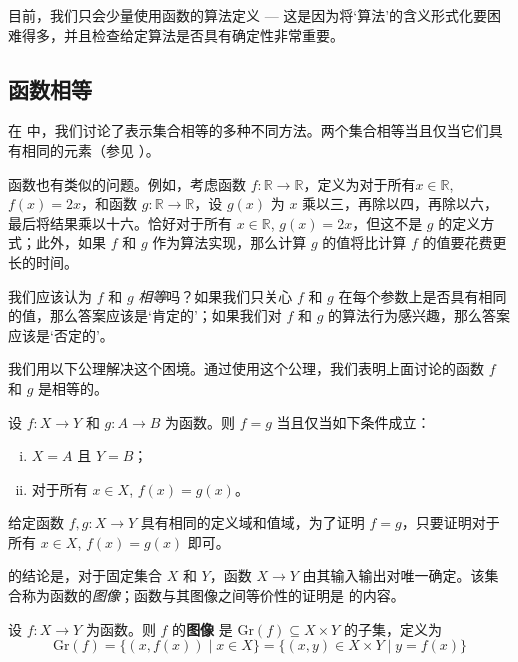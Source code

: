 目前，我们只会少量使用函数的算法定义 --- 这是因为将`算法'的含义形式化要困难得多，并且检查给定算法是否具有确定性非常重要。

\subsection*{函数相等}

在  中，我们讨论了表示集合相等的多种不同方法。两个集合相等当且仅当它们具有相同的元素（参见 ）。

函数也有类似的问题。例如，考虑函数 $f : \mathbb{R} \to \mathbb{R}$，定义为对于所有$x \in \mathbb{R}$, $f(x) = 2x$，和函数 $g : \mathbb{R} \to \mathbb{R}$，设 $g(x)$ 为 $x$ 乘以三，再除以四，再除以六，最后将结果乘以十六。恰好对于所有 $x \in \mathbb{R}$, $g(x) = 2x$，但这不是 $g$ 的定义方式；此外，如果 $f$ 和 $g$ 作为算法实现，那么计算 $g$ 的值将比计算 $f$ 的值要花费更长的时间。

我们应该认为 $f$ 和 $g$ \textit{相等}吗？如果我们只关心 $f$ 和 $g$ 在每个参数上是否具有相同的值，那么答案应该是`肯定的'；如果我们对 $f$ 和 $g$ 的算法行为感兴趣，那么答案应该是`否定的'。

我们用以下公理解决这个困境。通过使用这个公理，我们表明上面讨论的函数 $f$ 和 $g$ 是相等的。

\begin{axiom}[函数外延性]
\label{axFunctionExtensionality}
设 $f : X \to Y$ 和 $g : A \to B$ 为函数。则 $f = g$ 当且仅当如下条件成立：
\begin{enumerate}[(i)]
\item $X=A$ 且 $Y=B$；
\item 对于所有 $x \in X$, $f(x) = g(x)$。
\end{enumerate}
\end{axiom}

\begin{strategy}[证明两个函数相等]
\label{strFunctionExtensionality}
给定函数 $f, g : X \to Y$ 具有相同的定义域和值域，为了证明 $f=g$，只要证明对于所有 $x \in X$, $f(x) = g(x)$ 即可。
\end{strategy}

 的结论是，对于固定集合 $X$ 和 $Y$，函数 $X \to Y$ 由其输入输出对唯一确定。该集合称为函数的\textit{图像}；函数与其图像之间等价性的证明是  的内容。

\begin{definition}
\label{defFunctionGraph}
设 $f : X \to Y$ 为函数。则 $f$ 的\textbf{图像} 是 $\mathrm{Gr}(f) \subseteq X \times Y$  的子集，定义为
\[ \mathrm{Gr}(f) = \{ (x, f(x)) \mid x \in X \} = \{ (x,y) \in X \times Y \mid y=f(x) \} \]
\end{definition}

